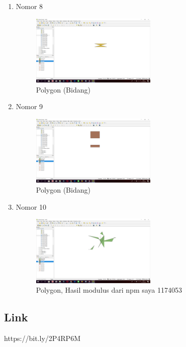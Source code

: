 \begin{enumerate}
	\item Nomor 8
	
	\begin{figure}[H]
		\includegraphics[width=6cm]{figures/Tugas2/1174053/no8.png}
		\centering
		\caption{Polygon (Bidang)}
	\end{figure}
	
	\item Nomor 9
	
	\begin{figure}[H]
		\includegraphics[width=6cm]{figures/Tugas2/1174053/no9.png}
		\centering
		\caption{Polygon (Bidang)}
	\end{figure}
	
	\item Nomor 10
	
	\begin{figure}[H]
		\includegraphics[width=6cm]{figures/Tugas2/1174053/no10.png}
		\centering
		\caption{Polygon, Hasil modulus dari npm saya 1174053} 
	\end{figure}
	
\end{enumerate}
\subsection{Link}
https://bit.ly/2P4RP6M
